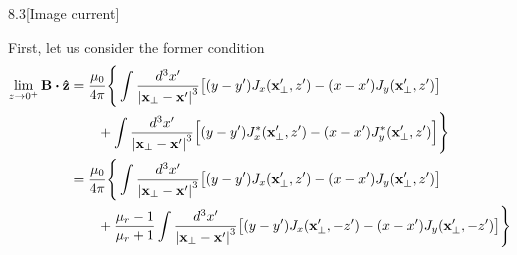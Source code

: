 \documentclass[12pt]{article}
\begin{document}
\begin{problem}{8.3}[Image current]
\begin{solution}
First, let us consider the former condition
\begin{align}
    \lim_{z\to0^+}\vb{B}\vdot\zhat
    &=\frac{\mu_0}{4\pi}\Bigg\{\int\frac{d^3x'}{\abs{\vb{x}_\bot-\vb{x}'}^3}
        \qty[(y-y')J_x(\vb{x}_\bot',z')-(x-x')J_y(\vb{x}_\bot',z')]\notag\\
    &\qquad+\int\frac{d^3x'}{\abs{\vb{x}_\bot-\vb{x}'}^3}
        \qty[(y-y')J_x^\ast(\vb{x}_\bot',z')-(x-x')J_y^\ast(\vb{x}_\bot',z')]
\Bigg\}\notag\\
    &=\frac{\mu_0}{4\pi}\Bigg\{\int\frac{d^3x'}{\abs{\vb{x}_\bot-\vb{x}'}^3}
        \qty[(y-y')J_x(\vb{x}_\bot',z')-(x-x')J_y(\vb{x}_\bot',z')]\notag\\
    &\qquad+\frac{\mu_r-1}{\mu_r+1}\int\frac{d^3x'}{\abs{\vb{x}_\bot-\vb{x}'}^3}
        \qty[(y-y')J_x(\vb{x}_\bot',-z')-(x-x')J_y(\vb{x}_\bot',-z')]
\Bigg\}
\end{align}


\end{solution}
\end{problem}
\end{document}

